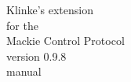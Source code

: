 \begin{center}
\vspace{1cm}
\Huge{Klinke's \reaper extension}\\[1mm]
\huge{for the}\\
\Huge{Mackie Control Protocol}\\[1cm]
\huge{version 0.9.8}\\[3cm]
\huge{manual}
\end{center}

